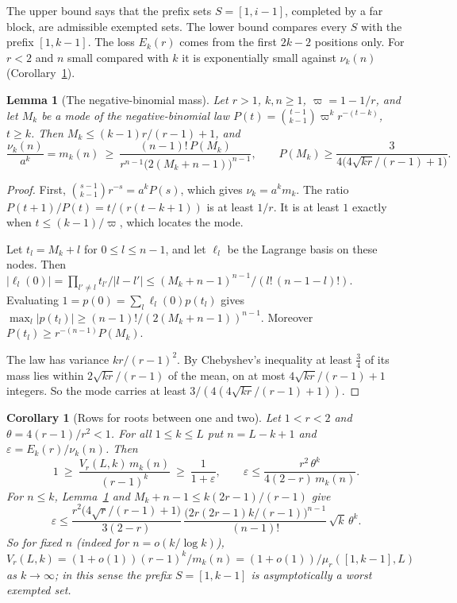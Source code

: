 \documentclass[11pt]{article}
\newtheorem{lemma}[theorem]{Lemma}
\newtheorem{corollary}[theorem]{Corollary}
\begin{document}
The upper bound says that the prefix sets $S=[1,i-1]$, completed by a far
block, are admissible exempted sets.  The lower bound compares every $S$
with the prefix $[1,k-1]$.  The loss $E_k(r)$ comes from the first $2k-2$
positions only.  For $r<2$ and $n$ small compared with $k$ it is exponentially small
against $\nu_k(n)$ (Corollary~\ref{cor:belowtwo}).

\begin{lemma}[The negative-binomial mass]\label{lem:nbmass}
Let $r>1$, $k,n\ge1$, $\varpi=1-1/r$, and let $M_k$ be a mode of the
negative-binomial law $P(t)=\binom{t-1}{k-1}\varpi^k r^{-(t-k)}$, $t\ge k$.
Then $M_k\le(k-1)r/(r-1)+1$, and
\[
  \frac{\nu_k(n)}{a^k}=m_k(n)\ \ge\
  \frac{(n-1)!\,P(M_k)}{r^{n-1}\bigl(2(M_k+n-1)\bigr)^{n-1}},
  \qquad
  P(M_k)\ge\frac3{4\bigl(4\sqrt{kr}/(r-1)+1\bigr)} .
\]
\end{lemma}

\begin{proof}
First, $\binom{s-1}{k-1}r^{-s}=a^kP(s)$, which gives $\nu_k=a^km_k$.  The
ratio $P(t+1)/P(t)=t/(r(t-k+1))$ is at least $1/r$.  It is at least $1$
exactly when $t\le(k-1)/\varpi$, which locates the mode.

Let $t_l=M_k+l$ for $0\le l\le n-1$, and let $\ell_l$ be the Lagrange basis
on these nodes.  Then
$|\ell_l(0)|=\prod_{l'\ne l}t_{l'}/|l-l'|\le(M_k+n-1)^{n-1}/(l!\,(n-1-l)!)$.
Evaluating $1=p(0)=\sum_l\ell_l(0)p(t_l)$ gives
$\max_l|p(t_l)|\ge(n-1)!/(2(M_k+n-1))^{n-1}$.  Moreover
$P(t_l)\ge r^{-(n-1)}P(M_k)$.

The law has variance $kr/(r-1)^2$.  By Chebyshev's inequality at
least $\frac34$ of its mass lies within $2\sqrt{kr}/(r-1)$ of the mean, on at most
$4\sqrt{kr}/(r-1)+1$ integers.  So the mode carries at least $3/(4(4\sqrt{kr}/(r-1)+1))$.
\end{proof}

\begin{corollary}[Rows for roots between one and two]\label{cor:belowtwo}
Let $1<r<2$ and $\theta=4(r-1)/r^2<1$.  For all $1\le k\le L$ put
$n=L-k+1$ and $\varepsilon=E_k(r)/\nu_k(n)$.  Then
\[
  1\ \ge\ \frac{V_r(L,k)\,m_k(n)}{(r-1)^k}\ \ge\
  \frac1{1+\varepsilon},\qquad
  \varepsilon\le\frac{r^2\,\theta^k}{4(2-r)\,m_k(n)} .
\]
For $n\le k$, Lemma~\ref{lem:nbmass} and $M_k+n-1\le k(2r-1)/(r-1)$ give
\[
  \varepsilon\le\frac{r^2\bigl(4\sqrt r/(r-1)+1\bigr)}{3(2-r)}\,
  \frac{\bigl(2r(2r-1)k/(r-1)\bigr)^{n-1}}{(n-1)!}\,\sqrt k\,\theta^k .
\]
So for fixed $n$ (indeed for $n=o(k/\log k)$),
$V_r(L,k)=(1+o(1))(r-1)^k/m_k(n)=(1+o(1))/\mu_r([1,k-1],L)$ as
$k\to\infty$; in this sense the prefix $S=[1,k-1]$ is asymptotically a
worst exempted set.
\end{corollary}
\end{document}
